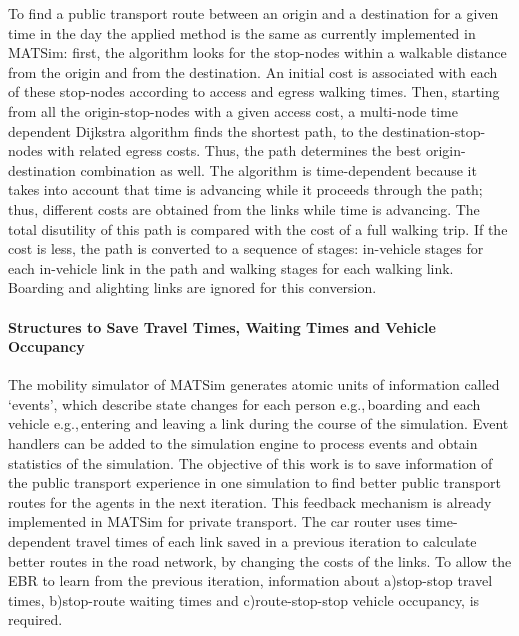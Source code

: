 To find a public transport route between an origin and a destination for a given time in the day the applied method is the same as currently implemented in MATSim: first, the algorithm looks for the stop-nodes within a walkable distance from the origin and from the destination. An initial cost is associated with each of these stop-nodes according to access and egress walking times. Then, starting from all the origin-stop-nodes with a given access cost, a multi-node time dependent Dijkstra algorithm finds the shortest path, to the destination-stop-nodes with related egress costs. Thus, the path determines the best origin-destination combination as well. The algorithm is time-dependent because it takes into account that time is advancing while it proceeds through the path; thus, different costs are obtained from the links while time is advancing. The total disutility of this path is compared with the cost of a full walking trip. If the cost is less, the path is converted to a sequence of stages: in-vehicle stages for each in-vehicle link in the path and walking stages for each walking link. Boarding and alighting links are ignored for this conversion.

\paragraph{Structures to Save Travel Times, Waiting Times and Vehicle Occupancy} 
\label{subsec:Structures}

The mobility simulator of MATSim generates atomic units of information called `events', which describe state changes for each person e.g.,\,boarding and each vehicle e.g.,\,entering and leaving a link during the course of the simulation. Event handlers can be added to the simulation engine to process events and obtain statistics of the simulation. The objective of this work is to save information of the public transport experience in one simulation to find better public transport routes for the agents in the next iteration. This feedback mechanism is already implemented in MATSim for private transport. The car router uses time-dependent travel times of each link saved in a previous iteration to calculate better routes in the road network, by changing the costs of the links. To allow the EBR to learn from the previous iteration, information about a)stop-stop travel times, b)stop-route waiting times and c)route-stop-stop vehicle occupancy, is required.


